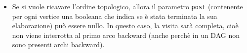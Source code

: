 \documentclass[a4paper]{article}
\newcommand{\code}[1]{\texttt{#1}}
\begin{document}
\begin{itemize}
\begin{itemize}
                \item Se si vuole ricavare l'ordine topologico, allora il parametro \code{post} (contenente per ogni vertice una booleana che indica se è stata terminata la sua elaborazione) può essere nullo. In questo caso, la visita sarà completa, cioè non viene interrotta al primo arco backward (anche perchè in un DAG non sono presenti archi backward).
            \end{itemize}
    \end{itemize}
\end{document}

